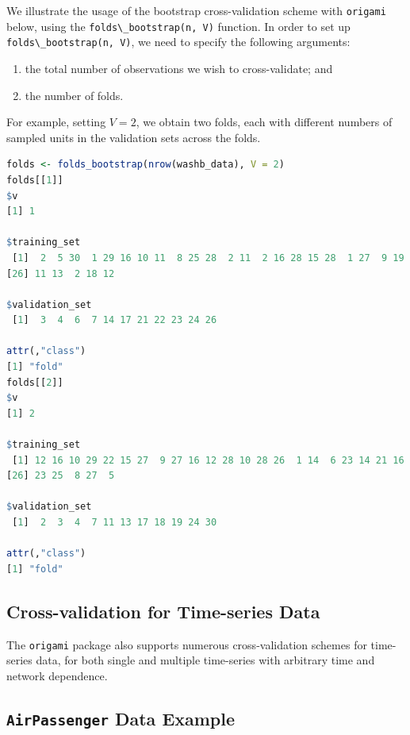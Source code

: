 \documentclass[
  12pt, krantz2,
]{krantz}
\newcommand{\passthrough}[1]{#1}
\providecommand{\tightlist}{%
  \setlength{\itemsep}{0pt}\setlength{\parskip}{0pt}}
\newcommand{\1}{\mathbbm{1}}
\theoremstyle{definition}
\theoremstyle{definition}
\theoremstyle{definition}
\theoremstyle{definition}
\theoremstyle{remark}
\begin{document}
We illustrate the usage of the bootstrap cross-validation scheme with \passthrough{\lstinline!origami!}
below, using the \passthrough{\lstinline!folds\_bootstrap(n, V)!} function. In order to set up
\passthrough{\lstinline!folds\_bootstrap(n, V)!}, we need to specify the following arguments:

\begin{enumerate}
\def\labelenumi{\arabic{enumi}.}
\tightlist
\item
  the total number of observations we wish to cross-validate; and
\item
  the number of folds.
\end{enumerate}

For example, setting \(V=2\), we obtain two folds, each with different numbers of
sampled units in the validation sets across the folds.

\begin{lstlisting}[language=R]
folds <- folds_bootstrap(nrow(washb_data), V = 2)
folds[[1]]
$v
[1] 1

$training_set
 [1]  2  5 30  1 29 16 10 11  8 25 28  2 11  2 16 28 15 28  1 27  9 19 20 30 18
[26] 11 13  2 18 12

$validation_set
 [1]  3  4  6  7 14 17 21 22 23 24 26

attr(,"class")
[1] "fold"
folds[[2]]
$v
[1] 2

$training_set
 [1] 12 16 10 29 22 15 27  9 27 16 12 28 10 28 26  1 14  6 23 14 21 16  5 20  8
[26] 23 25  8 27  5

$validation_set
 [1]  2  3  4  7 11 13 17 18 19 24 30

attr(,"class")
[1] "fold"
\end{lstlisting}

\hypertarget{cross-validation-for-time-series-data}{%
\subsection{Cross-validation for Time-series Data}\label{cross-validation-for-time-series-data}}

The \passthrough{\lstinline!origami!} package also supports numerous cross-validation schemes for
time-series data, for both single and multiple time-series
with arbitrary time and network dependence.

\hypertarget{airpassenger-data-example}{%
\subsection*{\texorpdfstring{\texttt{AirPassenger} Data Example}{AirPassenger Data Example}}\label{airpassenger-data-example}}
\end{document}
